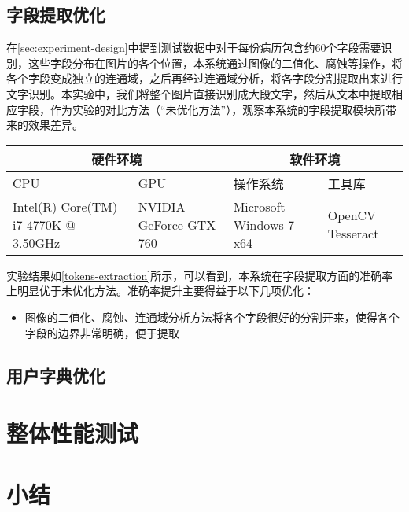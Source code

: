 \subsection{字段提取优化}
在\autoref{sec:experiment-design}中提到测试数据中对于每份病历包含约60个字段需要识别，这些字段分布在图片的各个位置，本系统通过图像的二值化、腐蚀等操作，将各个字段变成独立的连通域，之后再经过连通域分析，将各字段分割提取出来进行文字识别。本实验中，我们将整个图片直接识别成大段文字，然后从文本中提取相应字段，作为实验的对比方法（“未优化方法”），观察本系统的字段提取模块所带来的效果差异。
\begin{table}[!htbp]
	\label{tokens-extraction}
	\centering
	\vspace{10pt}
  \renewcommand\arraystretch{1.5}  %
	\begin{tabular}{p{3cm}|p{3cm}|p{3cm}|p{3cm}}
    \hline
    \multicolumn{2}{c|}{硬件环境} & \multicolumn{2}{c}{软件环境} \\
		\hline
    CPU&GPU&操作系统&工具库 \\
		\hline
    Intel(R) Core(TM)  i7-4770K @ 3.50GHz & NVIDIA GeForce  GTX 760 & Microsoft  Windows 7 x64 & OpenCV  Tesseract \\
    \hline
	\end{tabular}
\end{table}

实验结果如\autoref{tokens-extraction}所示，可以看到，本系统在字段提取方面的准确率上明显优于未优化方法。准确率提升主要得益于以下几项优化：
\begin{itemize}
  \item 图像的二值化、腐蚀、连通域分析方法将各个字段很好的分割开来，使得各个字段的边界非常明确，便于提取
\end{itemize}

\subsection{用户字典优化}
\section{整体性能测试}

\section{小结}

